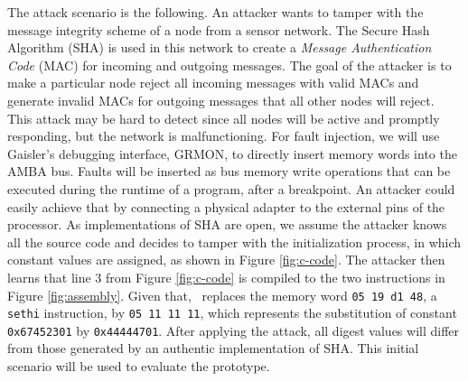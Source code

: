   The attack scenario is the following. An attacker wants to tamper with the message integrity scheme of a node from a sensor network. The Secure Hash Algorithm (SHA) is used in this network to create a \textit{Message Authentication Code} (MAC) for incoming and outgoing messages. The goal of the attacker is to make a particular node reject all incoming messages with valid MACs and generate invalid MACs for outgoing messages that all other nodes will reject. This attack may be hard to detect since all nodes will be active and promptly responding, but the network is malfunctioning. 
% 
For fault injection, we will use Gaisler's debugging interface, GRMON, to directly insert memory words into the AMBA bus. Faults will be inserted as bus memory write operations that can be executed during the runtime of a program, after a breakpoint. An attacker could easily achieve that by connecting a physical adapter to the external pins of the processor.
% 
   As implementations of SHA are open, we assume the attacker knows all the source code and decides to tamper with the initialization process, in which constant values are assigned, as shown in Figure \ref{fig:c-code}. The attacker then learns that line 3 from Figure \ref{fig:c-code} is compiled to the two instructions in Figure \ref{fig:assembly}. Given that, \attacker~replaces the memory word \texttt{05 19 d1 48}, a \texttt{sethi} instruction, by \texttt{05 11 11 11}, which represents the substitution of constant \texttt{0x67452301} by \texttt{0x44444701}. After applying the attack, all digest values will differ from those generated by an authentic implementation of SHA. This initial scenario will be used to evaluate the \cshia prototype.
% 

